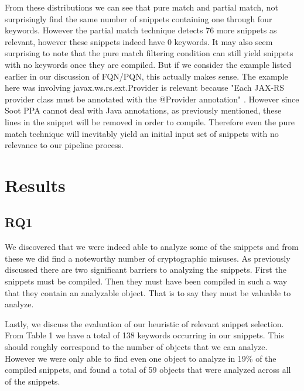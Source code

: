 \documentclass[10pt, conference]{IEEEtran}
\begin{document}
From these distributions we can see that pure match and partial match, not surprisingly find the same number of snippets containing one through four keywords. However the partial match technique detects 76 more snippets as relevant, however these snippets indeed have 0 keywords. It may also seem surprising to note that the pure match filtering condition can still yield snippets with no keywords once they are compiled. But if we consider the example listed earlier in our discussion of FQN/PQN, this actually makes sense. The example here was involving javax.ws.rs.ext.Provider is relevant because "Each JAX-RS provider class must be annotated with the @Provider annotation" \cite{jax.Provider}. However since Soot PPA cannot deal with Java annotations, as previously mentioned, these lines in the snippet will be removed in order to compile. Therefore even the pure match technique will inevitably yield an initial input set of snippets with no relevance to our pipeline process.

\section{Results}

\subsection{RQ1}

We discovered that we were indeed able to analyze some of the snippets and from these we did find a noteworthy number of cryptographic misuses. As previously discussed there are two significant barriers to analyzing the snippets. First the snippets must be compiled. Then they must have been compiled in such a way that they contain an analyzable object. That is to say they must be valuable to analyze. 

Lastly, we discuss the evaluation of our heuristic of relevant snippet selection. From Table 1 we have a total of 138 keywords occurring in our snippets. This should roughly correspond to the number of objects that we can analyze. However we were only able to find even one object to analyze in 19\% of the compiled snippets, and found a total of 59 objects that were analyzed across all of the snippets. 
\end{document}
